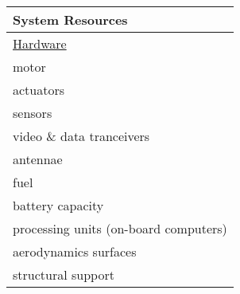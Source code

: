 \begin{table}[rc]
\begin{minipage}[t]{0.45\textwidth}
\vspace{0pt}
\begin{tabular}{l}
{\textbf{System Resources}}\\
\hline
\underline{Hardware} \\
motor \\
actuators \\
sensors \\
video \& data tranceivers \\
antennae \\
fuel\\battery capacity \\
processing units (on-board computers) \\
aerodynamics surfaces \\
structural support \vspace{5pt}\\


\end{tabular}
\end{minipage}
\end{table}
